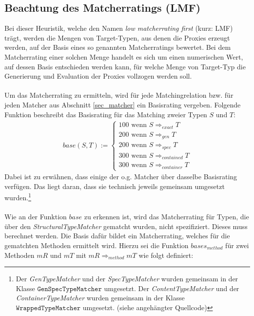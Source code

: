 \subsection{Beachtung des Matcherratings (LMF)}\label{sec_lmf}
Bei dieser Heuristik, welche den Namen \emph{low matcherrating first} (kurz: LMF) trägt, werden die Mengen von Target-Typen, aus denen die Proxies erzeugt werden, auf der Basis eines so genannten Matcherratings bewertet. Bei dem Matcherrating einer solchen Menge handelt es sich um einen numerischen Wert, auf dessen Basis entschieden werden kann, für welche Menge von Target-Typ die Generierung und Evaluation der Proxies vollzogen werden soll.
\\\\
Um das Matcherrating zu ermitteln, wird für jede Matchingrelation bzw. für jeden Matcher aus Abschnitt \ref{sec_matcher} ein Basisrating vergeben. Folgende Funktion beschreibt das Basisrating für das Matching zweier Typen $S$ und $T$:
\begin{gather*}
\mathit{base(S,T)} :=  \left\{ 
				\begin{array}{l}
					100 \text{ wenn } S \Rightarrow_{exact}  T  \\
					200 \text{ wenn } S \Rightarrow_{gen}  T  \\
					200 \text{ wenn } S \Rightarrow_{spec}  T  \\
					300 \text{ wenn } S \Rightarrow_{contained}  T   \\
					300 \text{ wenn } S \Rightarrow_{container}  T  				
				\end{array}             
	\right.
\end{gather*}
\noindent
Dabei ist zu erwähnen, dass einige der o.g. Matcher über dasselbe Basisrating verfügen. Das liegt daran, dass sie technisch jeweils gemeinsam umgesetzt wurden.\footnote{Der \emph{GenTypeMatcher} und der \emph{SpecTypeMatcher} wurden gemeinsam in der Klasse $\texttt{GenSpecTypeMatcher}$ umgesetzt. Der \emph{ContentTypeMatcher} und der \emph{ContainerTypeMatcher} wurden gemeinsam in der Klasse $\texttt{WrappedTypeMatcher}$ umgesetzt. (siehe angehängter Quellcode)}
\\\\
Wie an der Funktion $\mathit{base}$ zu erkennen ist, wird das Matcherrating für Typen, die über den \emph{StructuralTypeMatcher} gematcht wurden, nicht spezifiziert. Dieses muss berechnet werden. Die Basis dafür bildet ein Matcherrating, welches für die gematchten Methoden ermittelt wird. Hierzu sei die Funktion $\mathit{bases_{method}}$ für zwei Methoden $\mathit{mR}$ und $\mathit{mT}$ mit $\mathit{mR} \Rightarrow_{method} \mathit{mT}$ wie folgt definiert:
